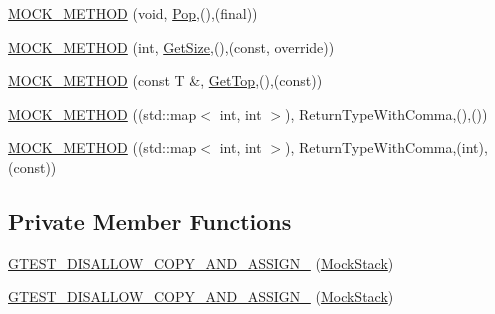 \begin{DoxyCompactItemize}
\item 
\mbox{\hyperlink{classtesting_1_1gmock__function__mocker__test_1_1_mock_stack_ae54b445bc4d2dd18520449e5edee0771}{M\+O\+C\+K\+\_\+\+M\+E\+T\+H\+OD}} (void, \mbox{\hyperlink{classtesting_1_1gmock__function__mocker__test_1_1_stack_interface_a9316d84cdc42996c0a0a2ae89b693926}{Pop}},(),(final))
\item 
\mbox{\hyperlink{classtesting_1_1gmock__function__mocker__test_1_1_mock_stack_a4283f356c5153e7e2eea0aeb424a61be}{M\+O\+C\+K\+\_\+\+M\+E\+T\+H\+OD}} (int, \mbox{\hyperlink{classtesting_1_1gmock__function__mocker__test_1_1_stack_interface_a09def067a391dbb6a35d5b52e616774c}{Get\+Size}},(),(const, override))
\item 
\mbox{\hyperlink{classtesting_1_1gmock__function__mocker__test_1_1_mock_stack_a17b01e582dc3c138e202c29ae9aec247}{M\+O\+C\+K\+\_\+\+M\+E\+T\+H\+OD}} (const T \&, \mbox{\hyperlink{classtesting_1_1gmock__function__mocker__test_1_1_stack_interface_a253773e41b8014042ab554d5f8e89e36}{Get\+Top}},(),(const))
\item 
\mbox{\hyperlink{classtesting_1_1gmock__function__mocker__test_1_1_mock_stack_ae0e6e3d10e20435b40308a5c3dd4cc9d}{M\+O\+C\+K\+\_\+\+M\+E\+T\+H\+OD}} ((std\+::map$<$ int, int $>$), Return\+Type\+With\+Comma,(),())
\item 
\mbox{\hyperlink{classtesting_1_1gmock__function__mocker__test_1_1_mock_stack_acecb9a897885e7847da425933c9cbc1d}{M\+O\+C\+K\+\_\+\+M\+E\+T\+H\+OD}} ((std\+::map$<$ int, int $>$), Return\+Type\+With\+Comma,(int),(const))
\end{DoxyCompactItemize}
\subsection*{Private Member Functions}
\begin{DoxyCompactItemize}
\item 
\mbox{\hyperlink{classtesting_1_1gmock__function__mocker__test_1_1_mock_stack_af61db0f565469ffc713d467c3fcddb65}{G\+T\+E\+S\+T\+\_\+\+D\+I\+S\+A\+L\+L\+O\+W\+\_\+\+C\+O\+P\+Y\+\_\+\+A\+N\+D\+\_\+\+A\+S\+S\+I\+G\+N\+\_\+}} (\mbox{\hyperlink{classtesting_1_1gmock__function__mocker__test_1_1_mock_stack}{Mock\+Stack}})
\item 
\mbox{\hyperlink{classtesting_1_1gmock__function__mocker__test_1_1_mock_stack_af61db0f565469ffc713d467c3fcddb65}{G\+T\+E\+S\+T\+\_\+\+D\+I\+S\+A\+L\+L\+O\+W\+\_\+\+C\+O\+P\+Y\+\_\+\+A\+N\+D\+\_\+\+A\+S\+S\+I\+G\+N\+\_\+}} (\mbox{\hyperlink{classtesting_1_1gmock__function__mocker__test_1_1_mock_stack}{Mock\+Stack}})
\end{DoxyCompactItemize}



